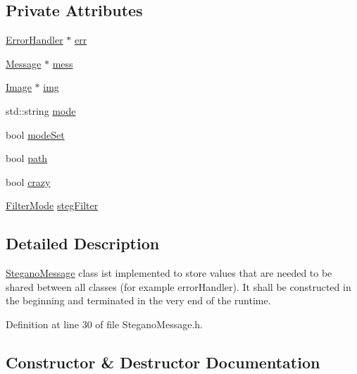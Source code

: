 \subsection*{Private Attributes}
\begin{DoxyCompactItemize}
\item 
\mbox{\hyperlink{classErrorHandler}{Error\+Handler}} $\ast$ \mbox{\hyperlink{classSteganoMessage_a26b631e00716be7a89cbcf22cf0b7291}{err}}
\item 
\mbox{\hyperlink{classMessage}{Message}} $\ast$ \mbox{\hyperlink{classSteganoMessage_a64f70bbacb0662cebe764316658da35d}{mess}}
\item 
\mbox{\hyperlink{classImage}{Image}} $\ast$ \mbox{\hyperlink{classSteganoMessage_acd7dba217d5df515d93ddf814734ecf4}{img}}
\item 
std\+::string \mbox{\hyperlink{classSteganoMessage_a8772194b7823da730648f8d4c06334a8}{mode}}
\item 
bool \mbox{\hyperlink{classSteganoMessage_ae1da17c621a8db71fa4eb3b148a82ceb}{mode\+Set}}
\item 
bool \mbox{\hyperlink{classSteganoMessage_a399f4c181d3b7b15ccdb5c925a7a1f51}{path}}
\item 
bool \mbox{\hyperlink{classSteganoMessage_aa66c9e1d0367981d42ede819e1a51131}{crazy}}
\item 
\mbox{\hyperlink{constants_8h_a36bd51b89b9e0e6e4dbbe565b9155083}{Filter\+Mode}} \mbox{\hyperlink{classSteganoMessage_af20fb772ae34deaccd23144b38f06320}{steg\+Filter}}
\end{DoxyCompactItemize}


\subsection{Detailed Description}
\mbox{\hyperlink{classSteganoMessage}{Stegano\+Message}} class ist implemented to store values that are needed to be shared between all classes (for example error\+Handler). It shall be constructed in the beginning and terminated in the very end of the runtime. 

Definition at line 30 of file Stegano\+Message.\+h.



\subsection{Constructor \& Destructor Documentation}
\mbox{\label{classSteganoMessage_a7a14cbd03ebca6764f8b234f8dcd1697}} 
